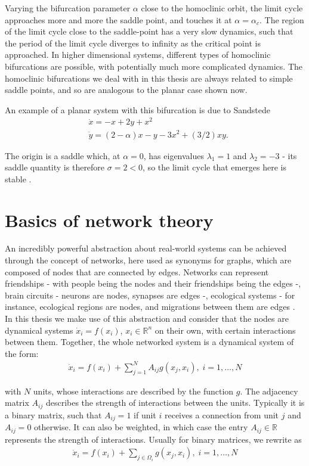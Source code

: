 Varying the bifurcation parameter $\alpha$ close to the homoclinic orbit, the limit cycle approaches more and more the saddle point, and touches it at $\alpha = \alpha_c$. The region of the limit cycle close to the saddle-point has a very slow dynamics, such that the period of the limit cycle diverges to infinity as the critical point is approached. In higher dimensional systems, different types of homoclinic bifurcations are possible, with potentially much more complicated dynamics. The homoclinic bifurcations we deal with in this thesis are always related to simple saddle points, and so are analogous to the planar case shown now. 

An example of a planar system with this bifurcation is due to Sandstede \cite{sandstede1997constructing}
%
\begin{align}
    &\dot{x} = -x + 2y + x^2  \\ 
    &\dot{y} = (2-\alpha)x - y - 3x^2 + (3/2)xy.
    \label{eq:sandstede}
\end{align}

The origin is a saddle which, at $\alpha=0$, has eigenvalues $\lambda_1 =1$ and $\lambda_2 = -3$ - its saddle quantity is therefore $\sigma = 2 < 0$, so the limit cycle that emerges here is stable \cite{kuznetsov}.


\section{Basics of network theory}
An incredibly powerful abstraction about real-world systems can be achieved through the concept of networks, here used as synonyms for graphs, which are composed of nodes that are connected by edges. Networks can represent friendships - with people being the nodes and their friendships being the edges -, brain circuits - neurons are nodes, synapses are edges \cite{bullmore2009complex} -, ecological systems - for instance, ecological regions are nodes, and migrations between them are edges \cite{landi2018complexity}. In this thesis we make use of this abstraction and consider that the nodes are dynamical systems $\dot{x}_i = f(x_i)$, $x_i \in \mathbb{R}^n$ on their own, with certain interactions between them. Together, the whole networked system is a dynamical system of the form:
%
\begin{align}
    \dot{x}_i = f(x_i) + \sum_{j=1}^N A_{ij} g(x_j, x_i),\; i=1,\ldots,N
    \label{eq:network-general}
\end{align} 

with $N$ units, whose interactions are described by the function $g$. The adjacency matrix $A_{ij}$ describes the strength of interactions between the units. Typically it is a binary matrix, such that $A_{ij} = 1$ if unit $i$ receives a connection from unit $j$ and $A_{ij} = 0$ otherwise. It can also be weighted, in which case the entry $A_{ij} \in \mathbb{R}$ represents the strength of interactions. Usually for binary matrices, we rewrite  as 
%
\begin{align}
    \dot{x}_i = f(x_i) + \sum_{j \in \Omega_i} g(x_j, x_i),\; i=1,\ldots,N
    \label{eq:network-general-neighborhood}
\end{align} 

